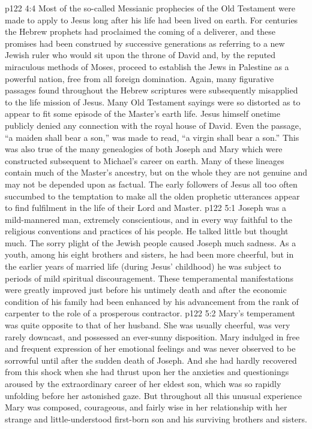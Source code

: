 \vs p122 4:4 Most of the so\hyp{}called Messianic prophecies of the Old Testament were made to apply to Jesus long after his life had been lived on earth. For centuries the Hebrew prophets had proclaimed the coming of a deliverer, and these promises had been construed by successive generations as referring to a new Jewish ruler who would sit upon the throne of David and, by the reputed miraculous methods of Moses, proceed to establish the Jews in Palestine as a powerful nation, free from all foreign domination. Again, many figurative passages found throughout the Hebrew scriptures were subsequently misapplied to the life mission of Jesus. Many Old Testament sayings were so distorted as to appear to fit some episode of the Master’s earth life. Jesus himself onetime publicly denied any connection with the royal house of David. Even the passage, “a maiden shall bear a son,” was made to read, “a virgin shall bear a son.” This was also true of the many genealogies of both Joseph and Mary which were constructed subsequent to Michael’s career on earth. Many of these lineages contain much of the Master’s ancestry, but on the whole they are not genuine and may not be depended upon as factual. The early followers of Jesus all too often succumbed to the temptation to make all the olden prophetic utterances appear to find fulfilment in the life of their Lord and Master.
\vs p122 5:1 Joseph was a mild\hyp{}mannered man, extremely conscientious, and in every way faithful to the religious conventions and practices of his people. He talked little but thought much. The sorry plight of the Jewish people caused Joseph much sadness. As a youth, among his eight brothers and sisters, he had been more cheerful, but in the earlier years of married life (during Jesus’ childhood) he was subject to periods of mild spiritual discouragement. These temperamental manifestations were greatly improved just before his untimely death and after the economic condition of his family had been enhanced by his advancement from the rank of carpenter to the role of a prosperous contractor.
\vs p122 5:2 Mary’s temperament was quite opposite to that of her husband. She was usually cheerful, was very rarely downcast, and possessed an ever\hyp{}sunny disposition. Mary indulged in free and frequent expression of her emotional feelings and was never observed to be sorrowful until after the sudden death of Joseph. And she had hardly recovered from this shock when she had thrust upon her the anxieties and questionings aroused by the extraordinary career of her eldest son, which was so rapidly unfolding before her astonished gaze. But throughout all this unusual experience Mary was composed, courageous, and fairly wise in her relationship with her strange and little\hyp{}understood first\hyp{}born son and his surviving brothers and sisters.
